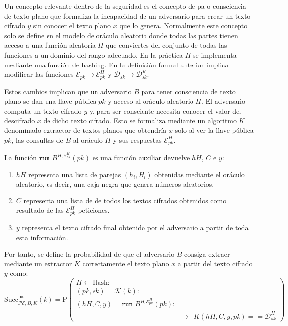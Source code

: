 Un concepto relevante dentro de la seguridad es el concepto de  \acrshort{pa} o consciencia de texto plano que formaliza la incapacidad de un adversario para crear un texto cifrado \(y\) sin conocer el texto plano \(x\) que lo genera. Normalmente este concepto solo se define en el modelo de oráculo aleatorio donde todas las partes tienen acceso a una función aleatoria \(H\) que conviertes del conjunto de todas las funciones a un dominio del rango adecuado. En la práctica \(H\) se implementa mediante una función de hashing. En la definición formal anterior implica modificar las funciones \(\mathcal{E}_{pk}\rightarrow\mathcal{E}_{pk}^H\) y \(\mathcal{D}_{sk}\rightarrow\mathcal{D}_{sk}^H\).
\newline

Estos cambios implican que un adversario \(B\) para tener consciencia de texto plano se dan una llave pública \(pk\) y acceso al oráculo aleatorio \(H\). El adversario computa un texto cifrado \(y\) y, para ser consciente necesita conocer el valor del descifrado \(x\) de dicho texto cifrado. Esto se formaliza mediante un algoritmo \(K\) denominado extractor de textos planos que obtendría \(x\) solo al ver la llave pública \(pk\), las consultas de \(B\) al oráculo \(H\) y sus respuestas \(\mathcal{E}_{pk}^H\).
\newline

La función $\texttt{run } B^{H,\mathcal{E}_{pk}^H}(pk)$ es una función auxiliar devuelve \(hH\), \(C\) e \(y\):
\begin{enumerate}
	\item \(hH\) representa una lista de parejas \((h_i,H_i)\) obtenidas mediante el oráculo aleatorio, es decir, una caja negra que genera números aleatorios.
	\item \(C\) representa una lista de de todos los textos cifrados obtenidos como resultado de las \(\mathcal{E}_{pk}^H\) peticiones.
	\item \(y\) representa el texto cifrado final obtenido por el adversario a partir de toda esta información.
\end{enumerate}

Por tanto, se define la probabilidad de que el adversario \(B\) consiga extraer mediante un extractor \(K\) correctamente el texto plano \(x\) a partir del texto cifrado \(y\) como:
\begin{equation}
 	\text{Succ}_{\mathcal{PE},B,K}^{\text{pa}}(k)=\text{P}\left(
 	\begin{array}{lcl}
 		H \leftarrow \text{Hash}:&&\\
 		(pk,sk)=\mathcal{K}(k):&&\\
 		(hH,C,y)=\texttt{run } B^{H,\mathcal{E}_{pk}^H}(pk):&&\\
 		&\rightarrow &K(hH,C,y,pk)==\mathcal{D}_{sk}^H
 	\end{array}
 	\right)
\end{equation}

